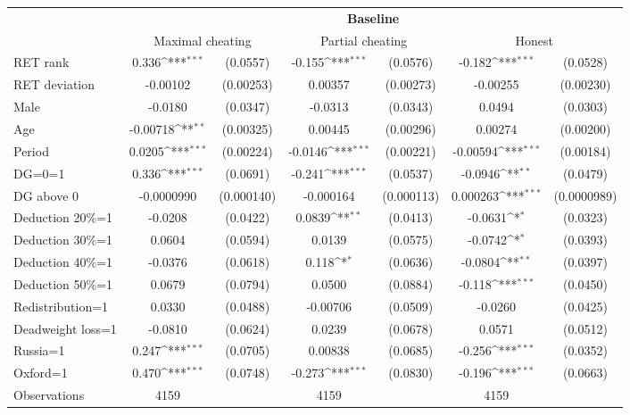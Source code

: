 \def\sym#1{\ifmmode^{#1}\else\(^{#1}\)\fi}
\begin{tabular}{lcccccc}
\hline\hline
&\multicolumn{6}{c}{\bf Baseline}\\
                &\multicolumn{2}{c}{Maximal cheating}&\multicolumn{2}{c}{Partial cheating}&\multicolumn{2}{c}{Honest}  \\
\hline
RET rank        &    0.336\sym{***}& (0.0557)&   -0.155\sym{***}& (0.0576)&   -0.182\sym{***}& (0.0528)\\
RET deviation   & -0.00102         &(0.00253)&  0.00357         &(0.00273)& -0.00255         &(0.00230)\\
Male            &  -0.0180         & (0.0347)&  -0.0313         & (0.0343)&   0.0494         & (0.0303)\\
Age             & -0.00718\sym{**} &(0.00325)&  0.00445         &(0.00296)&  0.00274         &(0.00200)\\
Period          &   0.0205\sym{***}&(0.00224)&  -0.0146\sym{***}&(0.00221)& -0.00594\sym{***}&(0.00184)\\
DG=0=1          &    0.336\sym{***}& (0.0691)&   -0.241\sym{***}& (0.0537)&  -0.0946\sym{**} & (0.0479)\\
DG above 0      &-0.0000990         &(0.000140)&-0.000164         &(0.000113)& 0.000263\sym{***}&(0.0000989)\\
Deduction 20\%=1&  -0.0208         & (0.0422)&   0.0839\sym{**} & (0.0413)&  -0.0631\sym{*}  & (0.0323)\\
Deduction 30\%=1&   0.0604         & (0.0594)&   0.0139         & (0.0575)&  -0.0742\sym{*}  & (0.0393)\\
Deduction 40\%=1&  -0.0376         & (0.0618)&    0.118\sym{*}  & (0.0636)&  -0.0804\sym{**} & (0.0397)\\
Deduction 50\%=1&   0.0679         & (0.0794)&   0.0500         & (0.0884)&   -0.118\sym{***}& (0.0450)\\
Redistribution=1&   0.0330         & (0.0488)& -0.00706         & (0.0509)&  -0.0260         & (0.0425)\\
Deadweight loss=1&  -0.0810         & (0.0624)&   0.0239         & (0.0678)&   0.0571         & (0.0512)\\
Russia=1        &    0.247\sym{***}& (0.0705)&  0.00838         & (0.0685)&   -0.256\sym{***}& (0.0352)\\
Oxford=1        &    0.470\sym{***}& (0.0748)&   -0.273\sym{***}& (0.0830)&   -0.196\sym{***}& (0.0663)\\
\hline
Observations    &     4159         &         &     4159         &         &     4159         &         \\

\end{tabular}
